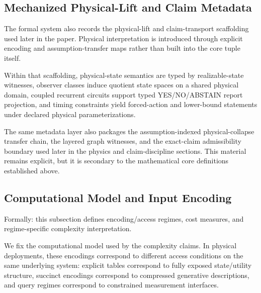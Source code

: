 \subsection{Mechanized Physical-Lift and Claim Metadata}\label{sec:foundations-mechanized-metadata}

The formal system also records the physical-lift and claim-transport scaffolding used later in the paper. Physical interpretation is introduced through explicit encoding and assumption-transfer maps rather than built into the core tuple itself.

Within that scaffolding, physical-state semantics are typed by realizable-state witnesses, observer classes induce quotient state spaces on a shared physical domain, coupled recurrent circuits support typed YES/NO/ABSTAIN report projection, and timing constraints yield forced-action and lower-bound statements under declared physical parameterizations.

The same metadata layer also packages the assumption-indexed physical-collapse transfer chain, the layered graph witnesses, and the exact-claim admissibility boundary used later in the physics and claim-discipline sections. This material remains explicit, but it is secondary to the mathematical core definitions established above.

\subsection{Computational Model and Input Encoding}\label{sec:encoding}

Formally: this subsection defines encoding/access regimes, cost measures, and regime-specific complexity interpretation.

We fix the computational model used by the complexity claims.
In physical deployments, these encodings correspond to different access conditions on the same underlying system: explicit tables correspond to fully exposed state/utility structure, succinct encodings correspond to compressed generative descriptions, and query regimes correspond to constrained measurement interfaces.

